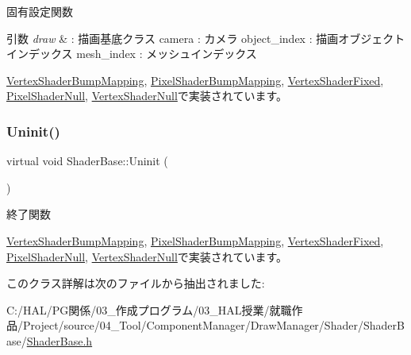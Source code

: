 固有設定関数 


\begin{DoxyParams}{引数}
{\em draw} & \+: 描画基底クラス camera \+: カメラ object\+\_\+index \+: 描画オブジェクトインデックス mesh\+\_\+index \+: メッシュインデックス \\
\hline
\end{DoxyParams}


\mbox{\hyperlink{class_vertex_shader_bump_mapping_ad81d57336763441c4071f967b57dbce1}{Vertex\+Shader\+Bump\+Mapping}}, \mbox{\hyperlink{class_pixel_shader_bump_mapping_afa80c2404b490a444d54cc47c681ca8f}{Pixel\+Shader\+Bump\+Mapping}}, \mbox{\hyperlink{class_vertex_shader_fixed_a87523c320f6f6767d59d7b24265db7ec}{Vertex\+Shader\+Fixed}}, \mbox{\hyperlink{class_pixel_shader_null_a8dd0194b5a22da5261ab35233a7cfdcd}{Pixel\+Shader\+Null}}, \mbox{\hyperlink{class_vertex_shader_null_aa2234c6ea083e3c0233d59f222145992}{Vertex\+Shader\+Null}}で実装されています。

\mbox{\label{class_shader_base_a784edfa81bec4d08a257ed4f02c61222}} 
\subsubsection{\texorpdfstring{Uninit()}{Uninit()}}
{\footnotesize\ttfamily virtual void Shader\+Base\+::\+Uninit (\begin{DoxyParamCaption}{ }\end{DoxyParamCaption})\hspace{0.3cm}{\ttfamily [pure virtual]}}



終了関数 



\mbox{\hyperlink{class_vertex_shader_bump_mapping_abed4e0aa9655fa7a7a21e03d00e7c0e5}{Vertex\+Shader\+Bump\+Mapping}}, \mbox{\hyperlink{class_pixel_shader_bump_mapping_a004f731db6dab6b59949baed4a5a32d7}{Pixel\+Shader\+Bump\+Mapping}}, \mbox{\hyperlink{class_vertex_shader_fixed_a49f630aee4757c8fd8bae886f22dfeb0}{Vertex\+Shader\+Fixed}}, \mbox{\hyperlink{class_pixel_shader_null_ae5ee2fa95e5da787918ccbd1877cd0ef}{Pixel\+Shader\+Null}}, \mbox{\hyperlink{class_vertex_shader_null_a16334df4ac02db3dd63f042622032301}{Vertex\+Shader\+Null}}で実装されています。



このクラス詳解は次のファイルから抽出されました\+:\begin{DoxyCompactItemize}
\item 
C\+:/\+H\+A\+L/\+P\+G関係/03\+\_\+作成プログラム/03\+\_\+\+H\+A\+L授業/就職作品/\+Project/source/04\+\_\+\+Tool/\+Component\+Manager/\+Draw\+Manager/\+Shader/\+Shader\+Base/\mbox{\hyperlink{_shader_base_8h}{Shader\+Base.\+h}}\end{DoxyCompactItemize}
